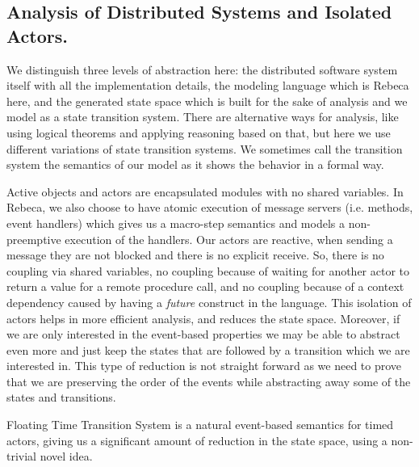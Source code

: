 \subsection{Analysis of Distributed Systems and Isolated Actors.}
We distinguish three levels of abstraction here: the distributed software system itself with all the implementation details, the modeling language which is Rebeca here, and the generated state space which is built for the sake of analysis and  we model as a state transition system. There are alternative ways for analysis, like using logical theorems and applying reasoning based on that, but here we use different variations of state transition systems.
We sometimes call the transition system the semantics of our model as it shows the behavior in a formal way.


Active objects and actors are encapsulated modules with no shared variables. In Rebeca, we also choose to have atomic execution of message servers (i.e. methods, event handlers) which gives us a macro-step semantics and models a non-preemptive execution of the handlers.
Our actors are reactive, when sending a message they are not blocked and there is no explicit receive. So, there is no coupling via shared variables, no coupling because of waiting for another actor to return a value for a remote procedure call, and no coupling because of a context dependency caused by having a \textit{future}  construct in the language.
This isolation of actors helps in more efficient analysis, and reduces the state space.
Moreover, if we are only interested in the event-based properties we may be able to abstract even more and just keep the states that are followed by a transition which we are interested in. This type of reduction is not straight forward as we need to prove that we are preserving the order of the events while abstracting away some of the states and transitions. 

Floating Time Transition System is a natural event-based semantics for timed actors, giving us a significant amount of reduction in the state space, using a non-trivial novel idea.
	